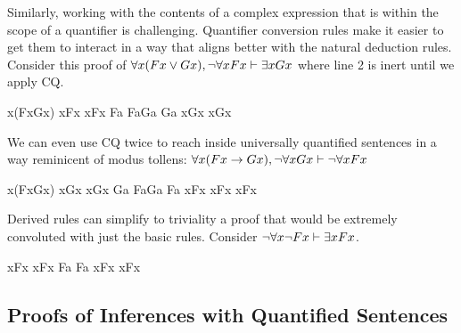 Similarly, working with the contents of a complex expression that is within the
scope of a quantifier is challenging. Quantifier conversion rules make it easier
to get them to interact in a way that aligns better with the natural deduction
rules. Consider this proof of
$\forall x(Fx\vee Gx),\neg\forall xFx\vdash\exists xGx$ where line 2 is
inert until we apply CQ.

\begin{fitchproof}
   {\eforall x(Fx\eor Gx)} 
   {\enot\eforall xFx}     
   {\eexists x\enot Fx}    
  \open
   {\enot Fa}              
   {Fa\eor Ga}             
   {Ga}                    
   {\eexists xGx}          
  \close
   {\eexists xGx}          
\end{fitchproof}

We can even use CQ twice to reach inside universally quantified sentences in a
way reminicent of modus tollens:
$\forall x(Fx\rightarrow Gx),\neg\forall xGx\vdash\neg\forall xFx$

\begin{fitchproof}
   {\eforall x(Fx\eif Gx)} 
   {\enot\eforall xGx}     
   {\eexists x\enot Gx}    
  \open
   {\enot Ga}              
   {Fa\eif Ga}             
   {\enot Fa}              
   {\eexists x\enot Fx}    
  \close
   {\eexists xFx}          
   {\enot\eforall xFx}     
\end{fitchproof}

Derived rules can simplify to triviality a proof that would be extremely
convoluted with just the basic rules. Consider
$\neg\forall x\neg Fx\vdash\exists xFx$.

\begin{fitchproof}
   {\enot\eforall x\enot Fx} 
   {\eexists x\enot\enot Fx} 
  \open
   {\enot\enot Fa}           
   {Fa}                      
   {\eexists xFx}            
  \close
  \have {} {\eexists xFx}             
\end{fitchproof}

\subsection{Proofs of Inferences with Quantified Sentences}

